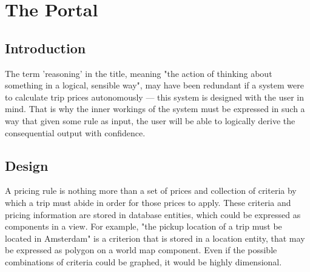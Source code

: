 \graphicspath{{Chapter5/Figs/Vector/}{Chapter5/Figs/}}

\chapter{The Portal}


\section{Introduction}
The term 'reasoning' in the title, meaning "the action of thinking about something in a logical, sensible way", may have been redundant if a system were to calculate trip prices autonomously --- this system is designed with the user in mind. That is why the inner workings of the system must be expressed in such a way that given some rule as input, the user will be able to logically derive the consequential output with confidence.

%
\section{Design}
A pricing rule is nothing more than a set of prices and collection of criteria by which a trip must abide in order for those prices to apply. These criteria and pricing information are stored in database entities, which could be expressed as components in a view. For example, "the pickup location of a trip must be located in Amsterdam" is a criterion that is stored in a location entity, that may be expressed as polygon on a world map component. Even if the possible combinations of criteria could be graphed, it would be highly dimensional.

